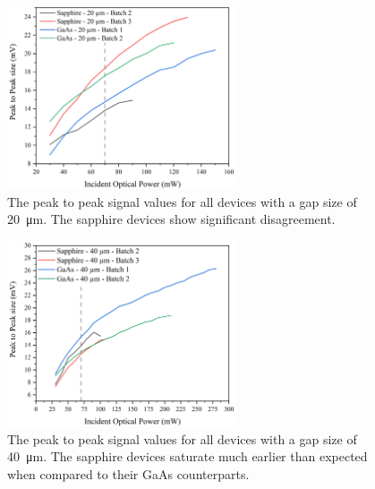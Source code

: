 \begin{figure}[h!]
    \centering
    \includegraphics[width=0.6\textwidth]{Figures/Misc/SysDev/Opt20micronG.png}
    \captionsetup{font = footnotesize, justification = centering}
    \caption[The Peak to Peak Signal Values for all Devices with \SI{20}{\micro\metre} Gap]{The peak to peak signal values for all devices with a gap size of \SI{20}{\micro\metre}. The sapphire devices show significant disagreement.}
    \label{fig:20micron}
\end{figure}

\begin{figure}[h!]
    \centering
    \includegraphics[width=0.6\textwidth]{Figures/Misc/SysDev/Opt40micronG.png}
    \captionsetup{font = footnotesize, justification = centering}
    \caption[The Peak to Peak Signal Values for all Devices with \SI{40}{\micro\metre} Gap]{The peak to peak signal values for all devices with a gap size of \SI{40}{\micro\metre}. The sapphire devices saturate much earlier than expected when compared to their GaAs counterparts.}
    \label{fig:s40micron}
\end{figure}

